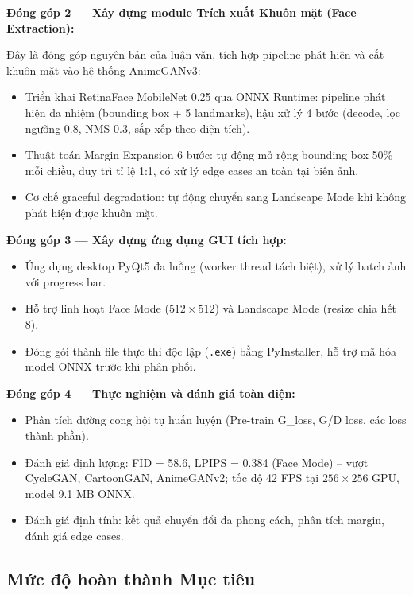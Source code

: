 \textbf{Đóng góp 2 — Xây dựng module Trích xuất Khuôn mặt (Face Extraction):}

Đây là đóng góp nguyên bản của luận văn, tích hợp pipeline phát hiện và cắt khuôn mặt vào hệ thống AnimeGANv3:
\begin{itemize}
    \item Triển khai RetinaFace MobileNet 0.25 qua ONNX Runtime: pipeline phát hiện đa nhiệm (bounding box + 5 landmarks), hậu xử lý 4 bước (decode, lọc ngưỡng 0.8, NMS 0.3, sắp xếp theo diện tích).
    \item Thuật toán Margin Expansion 6 bước: tự động mở rộng bounding box 50\% mỗi chiều, duy trì tỉ lệ 1:1, có xử lý edge cases an toàn tại biên ảnh.
    \item Cơ chế graceful degradation: tự động chuyển sang Landscape Mode khi không phát hiện được khuôn mặt.
\end{itemize}

\textbf{Đóng góp 3 — Xây dựng ứng dụng GUI tích hợp:}
\begin{itemize}
    \item Ứng dụng desktop PyQt5 đa luồng (worker thread tách biệt), xử lý batch ảnh với progress bar.
    \item Hỗ trợ linh hoạt Face Mode ($512 \times 512$) và Landscape Mode (resize chia hết 8).
    \item Đóng gói thành file thực thi độc lập (\texttt{.exe}) bằng PyInstaller, hỗ trợ mã hóa model ONNX trước khi phân phối.
\end{itemize}

\textbf{Đóng góp 4 — Thực nghiệm và đánh giá toàn diện:}
\begin{itemize}
    \item Phân tích đường cong hội tụ huấn luyện (Pre-train G\_loss, G/D loss, các loss thành phần).
    \item Đánh giá định lượng: FID = 58.6, LPIPS = 0.384 (Face Mode) -- vượt CycleGAN, CartoonGAN, AnimeGANv2; tốc độ 42 FPS tại $256\times256$ GPU, model 9.1 MB ONNX.
    \item Đánh giá định tính: kết quả chuyển đổi đa phong cách, phân tích margin, đánh giá edge cases.
\end{itemize}

\subsection{Mức độ hoàn thành Mục tiêu}
\label{subsec:goal_completion}

